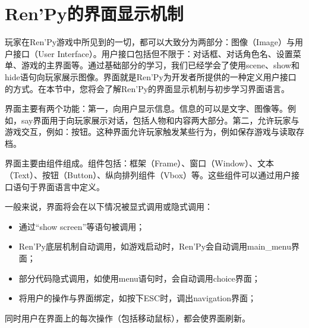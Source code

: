 \documentclass[../../Main.tex]{subfiles}
\begin{document}
\section{Ren'Py的界面显示机制}
玩家在Ren'Py游戏中所见到的一切，都可以大致分为两部分：图像（Image）与用户接口（User Interface）。用户接口包括但不限于：对话框、对话角色名、设置菜单、游戏的主界面等。通过基础部分的学习，我们已经学会了使用scene、show和hide语句向玩家展示图像。界面就是Ren'Py为开发者所提供的一种定义用户接口的方式。在本节中，您将会了解Ren'Py的界面显示机制与初步学习界面语言。

界面主要有两个功能：第一，向用户显示信息。信息的可以是文字、图像等。例如，say界面用于向玩家展示对话，包括人物和内容两大部分。第二，允许玩家与游戏交互，例如：按钮。这种界面允许玩家触发某些行为，例如保存游戏与读取存档。

界面主要由组件组成。组件包括：框架（Frame）、窗口（Window）、文本（Text）、按钮（Button）、纵向排列组件（Vbox）等。这些组件可以通过用户接口语句于界面语言中定义。

一般来说，界面将会在以下情况被显式调用或隐式调用：

\begin{itemize}
    \item 通过“show screen”等语句被调用；
    \item Ren'Py底层机制自动调用，如游戏启动时，Ren'Py会自动调用main\_menu界面；
    \item 部分代码隐式调用，如使用menu语句时，会自动调用choice界面；
    \item 将用户的操作与界面绑定，如按下ESC时，调出navigation界面；
\end{itemize}

同时用户在界面上的每次操作（包括移动鼠标），都会使界面刷新。
\end{document}
